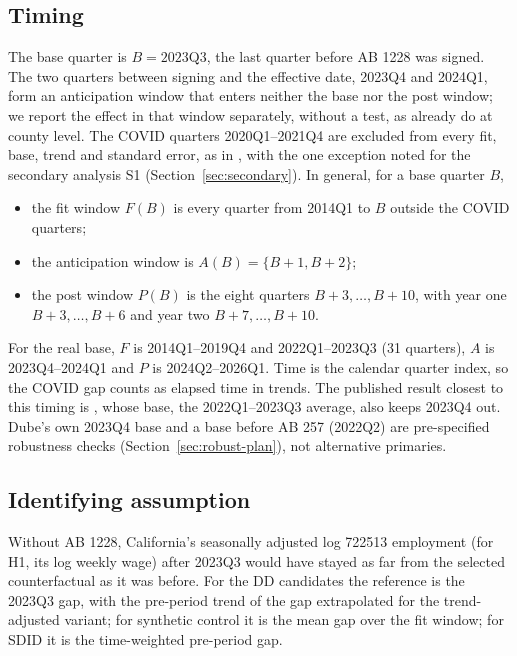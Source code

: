 \subsection{Timing}
\label{sec:timing}

The base quarter is $B = \text{2023Q3}$, the last quarter before AB 1228 was signed. The two quarters
between signing and the effective date, 2023Q4 and 2024Q1, form an anticipation window that enters
neither the base nor the post window; we report the effect in that window separately, without a
test, as \citet[Table~A3]{sosinskiy2026effects} already do at county level. The COVID quarters
2020Q1--2021Q4 are excluded from every fit, base, trend and standard error, as in
\citet{dube2026labor}, with the one exception noted for the secondary analysis S1
(Section~\ref{sec:secondary}). In general, for a base quarter $B$,
\begin{itemize}
  \item the fit window $F(B)$ is every quarter from 2014Q1 to $B$ outside the COVID quarters;
  \item the anticipation window is $A(B) = \{B+1, B+2\}$;
  \item the post window $P(B)$ is the eight quarters $B+3, \dots, B+10$, with year one $B+3, \dots, B+6$
        and year two $B+7, \dots, B+10$.
\end{itemize}
For the real base, $F$ is 2014Q1--2019Q4 and 2022Q1--2023Q3 (31 quarters), $A$ is 2023Q4--2024Q1 and
$P$ is 2024Q2--2026Q1. Time is the calendar quarter index, so the COVID gap counts as elapsed time
in trends. The published result closest to this timing is \citet[Table~1, Panel~B]{dube2026labor},
whose base, the 2022Q1--2023Q3 average, also keeps 2023Q4 out. Dube's own 2023Q4 base and a base
before AB 257 (2022Q2) are pre-specified robustness checks (Section~\ref{sec:robust-plan}), not
alternative primaries.

\subsection{Identifying assumption}
\label{sec:assumption}

Without AB 1228, California's seasonally adjusted log 722513 employment (for H1, its log weekly
wage) after 2023Q3 would have stayed as far from the selected counterfactual as it was before. For
the DD candidates the reference is the 2023Q3 gap, with the pre-period trend of the gap extrapolated
for the trend-adjusted variant; for synthetic control it is the mean gap over the fit window; for
SDID it is the time-weighted pre-period gap.

